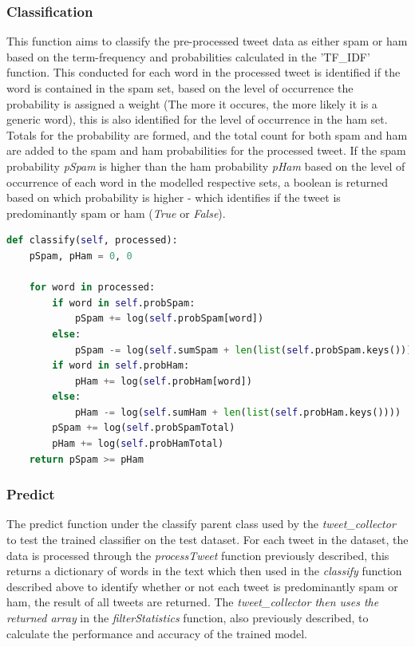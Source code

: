 \documentclass[oneside, 12pt]{article}
\begin{document}
		\subsubsection{Classification}
		
		This function aims to classify the pre-processed tweet data as either spam or ham based on the term-frequency and probabilities calculated in the 'TF\_IDF' function. This conducted for each word in the processed tweet is identified if the word is contained in the spam set, based on the level of occurrence the probability is assigned a weight (The more it occures, the more likely it is a generic word), this is also identified for the level of occurrence in the ham set. Totals for the probability are formed, and the total count for both spam and ham are added to the spam and ham probabilities for the processed tweet. If the spam probability \textit{pSpam} is higher than the ham probability \textit{pHam} based on the level of occurrence of each word in the modelled respective sets, a boolean is returned based on which probability is higher - which identifies if the tweet is predominantly spam or ham (\textit{True} or \textit{False}).
		
		\begin{lstlisting}[language=python, caption=Classify Function of Parent classifier class of spam\_filter.py]
def classify(self, processed):
	pSpam, pHam = 0, 0
	
	for word in processed:
		if word in self.probSpam:
			pSpam += log(self.probSpam[word])
		else:
			pSpam -= log(self.sumSpam + len(list(self.probSpam.keys())))
		if word in self.probHam:
			pHam += log(self.probHam[word])
		else:
			pHam -= log(self.sumHam + len(list(self.probHam.keys())))
		pSpam += log(self.probSpamTotal)
		pHam += log(self.probHamTotal)
	return pSpam >= pHam
		\end{lstlisting}
		
		\subsubsection{Predict}
		
		The predict function under the classify parent class used by the \textit{tweet\_collector} to test the trained classifier on the test dataset. For each tweet in the dataset, the data is processed through the \textit{processTweet} function previously described, this returns a dictionary of words in the text which then used in the \textit{classify} function described above to identify whether or not each tweet is predominantly spam or ham, the result of all tweets are returned. The \textit{tweet\_collector then uses the returned array} in the \textit{filterStatistics} function, also previously described, to calculate the performance and accuracy of the trained model.
		
\end{document}
